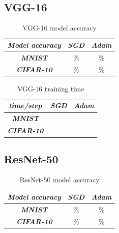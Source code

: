 \documentclass[conference]{IEEEtran}
\begin{document}
\subsection{VGG-16}

\begin{table}[htbp]
    \caption{VGG-16 model accuracy}
    \begin{center}
    \begin{tabular}{|c|c|c|}
    \cline{1-3} 
    \textit{Model accuracy} & \textbf{\textit{SGD}}& \textbf{\textit{Adam}} \\
    \hline
    \textbf{\textit{MNIST}} & \% & \% \\
    \hline
    \textbf{\textit{CIFAR-10}} & \% & \% \\
    \cline{1-3} 
    \end{tabular}
    \label{tab: VGG-16 model accuracy}
    \end{center}
\end{table}

\begin{table}[htbp]
    \caption{VGG-16 training time}
    \begin{center}
    \begin{tabular}{|c|c|c|}
    \cline{1-3} 
    \textit{time/step} & \textbf{\textit{SGD}}& \textbf{\textit{Adam}} \\
    \hline
    \textbf{\textit{MNIST}} &  &  \\
    \hline
    \textbf{\textit{CIFAR-10}} &  &  \\
    \cline{1-3} 
    \end{tabular}
    \label{tab: VGG-16 training time}
    \end{center}
\end{table}

\subsection{ResNet-50}

\begin{table}[htbp]
    \caption{ResNet-50 model accuracy}
    \begin{center}
    \begin{tabular}{|c|c|c|}
    \cline{1-3} 
    \textit{Model accuracy} & \textbf{\textit{SGD}}& \textbf{\textit{Adam}} \\
    \hline
    \textbf{\textit{MNIST}} & \% & \% \\
    \hline
    \textbf{\textit{CIFAR-10}} & \% & \% \\
    \cline{1-3} 
    \end{tabular}
    \label{tab: ResNet-50 model accuracy}
    \end{center}
\end{table}
\end{document}
